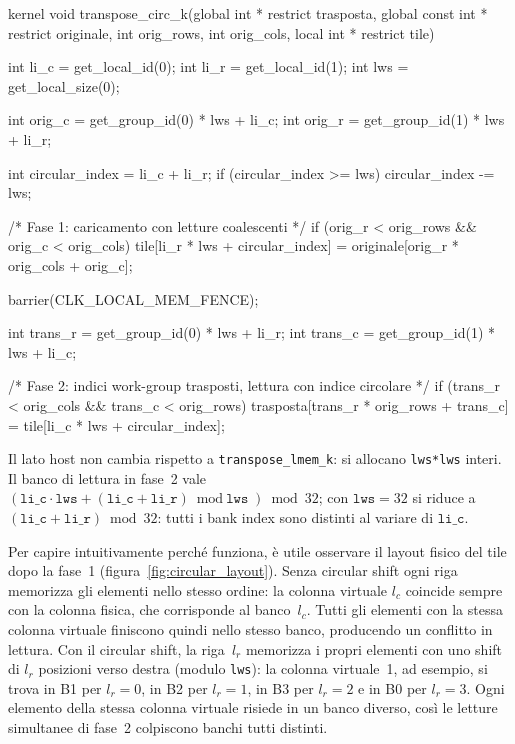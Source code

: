 \begin{code}[caption={Kernel di trasposizione con indirizzamento circolare}, label={code:transpose_circ}]
kernel void transpose_circ_k(global int * restrict trasposta,
                              global const int * restrict originale,
                              int orig_rows, int orig_cols,
                              local int * restrict tile)
{
    int li_c = get_local_id(0);
    int li_r = get_local_id(1);
    int lws  = get_local_size(0);

    int orig_c = get_group_id(0) * lws + li_c;
    int orig_r = get_group_id(1) * lws + li_r;

    int circular_index = li_c + li_r;
    if (circular_index >= lws) circular_index -= lws;

    /* Fase 1: caricamento con letture coalescenti */
    if (orig_r < orig_rows && orig_c < orig_cols)
        tile[li_r * lws + circular_index] = originale[orig_r * orig_cols + orig_c];

    barrier(CLK_LOCAL_MEM_FENCE);

    int trans_r = get_group_id(0) * lws + li_r;
    int trans_c = get_group_id(1) * lws + li_c;

    /* Fase 2: indici work-group trasposti, lettura con indice circolare */
    if (trans_r < orig_cols && trans_c < orig_rows)
        trasposta[trans_r * orig_rows + trans_c] = tile[li_c * lws + circular_index];
}
\end{code}

Il lato host non cambia rispetto a \texttt{transpose\_lmem\_k}: si allocano \texttt{lws*lws} interi. Il banco di lettura in fase~2 vale $(\texttt{li\_c}\cdot\texttt{lws}+(\texttt{li\_c}+\texttt{li\_r})\bmod\texttt{lws})\bmod 32$; con $\texttt{lws}=32$ si riduce a $(\texttt{li\_c}+\texttt{li\_r})\bmod 32$: tutti i bank index sono distinti al variare di $\texttt{li\_c}$.

Per capire intuitivamente perché funziona, è utile osservare il layout fisico del tile dopo la fase~1 (figura~\ref{fig:circular_layout}). Senza circular shift ogni riga memorizza gli elementi nello stesso ordine: la colonna virtuale $l_c$ coincide sempre con la colonna fisica, che corrisponde al banco~$l_c$. Tutti gli elementi con la stessa colonna virtuale finiscono quindi nello stesso banco, producendo un conflitto in lettura. Con il circular shift, la riga~$l_r$ memorizza i propri elementi con uno shift di $l_r$ posizioni verso destra (modulo \texttt{lws}): la colonna virtuale~1, ad esempio, si trova in B1 per $l_r=0$, in B2 per $l_r=1$, in B3 per $l_r=2$ e in B0 per $l_r=3$. Ogni elemento della stessa colonna virtuale risiede in un banco diverso, così le letture simultanee di fase~2 colpiscono banchi tutti distinti.

